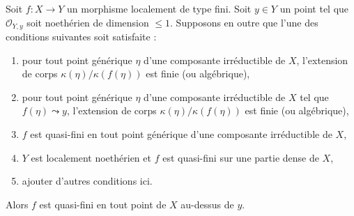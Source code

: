 \begin{lemma}
\label{lemma-quasi-finite-in-codim-1}
Soit $f : X \to Y$ un morphisme localement de type fini. Soit $y
\in Y$ un point tel que $\mathcal{O}_{Y, y}$ soit noethérien de dimension
$\leq 1$. Supposons en outre que l'une des conditions suivantes soit satisfaite :
\begin{enumerate}
\item pour tout point générique $\eta$ d'une composante irréductible
de $X$, l'extension de corps $\kappa(\eta)/\kappa(f(\eta))$
est finie (ou algébrique),
\item pour tout point générique $\eta$ d'une composante irréductible
de $X$ tel que $f(\eta) \leadsto y$, l'extension de corps
$\kappa(\eta)/\kappa(f(\eta))$ est finie (ou algébrique),
\item $f$ est quasi-fini en tout point générique d'une
composante irréductible de $X$,
\item $Y$ est localement noethérien et $f$
est quasi-fini sur une partie dense de $X$,
\item ajouter d'autres conditions ici.
\end{enumerate}
Alors $f$ est quasi-fini en tout point de $X$ au-dessus de $y$.
\end{lemma}

